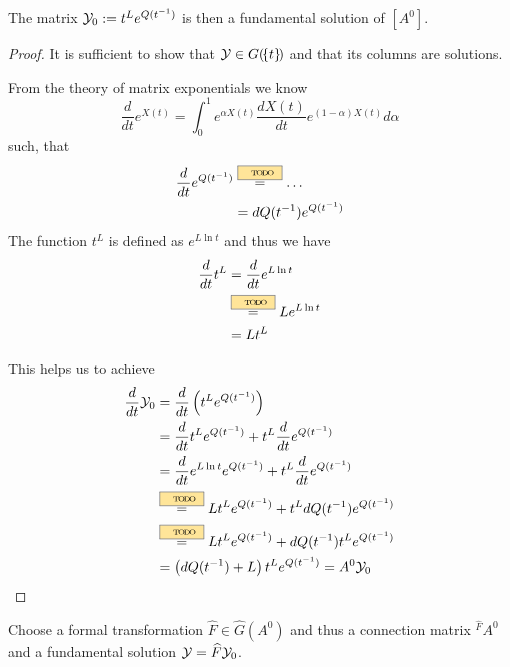 \begin{lem}
  The matrix $\mathcal{Y}_0:=t^Le^{Q(t^{-1})}$ is then a fundamental solution of
  $[A^0]$.
\end{lem}
\begin{proof}
  It is sufficient to show that $\mathcal{Y}\in G(\!\{t\}\!)$ and that its columns are
  solutions.

  From the theory of matrix exponentials \TODO[quelle?] we know
  \[
    \frac{d}{dt}e^{X(t)}=
    \int_0^1e^{\alpha X(t)}\frac{dX(t)}{dt}e^{(1-\alpha)X(t)}d\alpha
  \]
  such, that
  \begin{align*}
    \frac{d}{dt}e^{Q(t^{-1})}
    &\overset{\TODO{}}{=}\dots
  \\&=dQ(t^{-1})e^{Q(t^{-1})}
  \end{align*}
  The function $t^L$ is defined as $e^{L\ln t}$ and thus we have
  \begin{align*}
    \frac{d}{dt}t^L&=\frac{d}{dt}e^{L\ln t}
  \\&\overset{\TODO{}}{=}Le^{L\ln t}
  \\&=Lt^L
  \end{align*}

  This helps us to achieve
  \begin{align*}
    \frac{d}{dt}\cY_0
    &=\frac{d}{dt}\left(t^Le^{Q(t^{-1})}\right)
  \\&=\frac{d}{dt}t^Le^{Q(t^{-1})}+t^L\frac{d}{dt}e^{Q(t^{-1})}
  \\&=\frac{d}{dt}e^{L\ln t}e^{Q(t^{-1})}+t^L\frac{d}{dt}e^{Q(t^{-1})}
  \\&\overset{\TODO{}}{=}Lt^Le^{Q(t^{-1})}+t^LdQ(t^{-1})e^{Q(t^{-1})}
  \\&\overset{\TODO{}}{=}Lt^Le^{Q(t^{-1})}+dQ(t^{-1})t^Le^{Q(t^{-1})}
  \\&=\left(dQ(t^{-1})+L\right)t^Le^{Q(t^{-1})}=A^0\cY_0
  \end{align*}
  \TODO{}
\end{proof}

Choose a formal transformation $\hat F\in\hat G(A^0)$ and thus a connection
matrix ${}^{\hat F}\!A^0$ and a fundamental solution $\mathcal{Y}=\widehat F\mathcal{Y}_0$.
